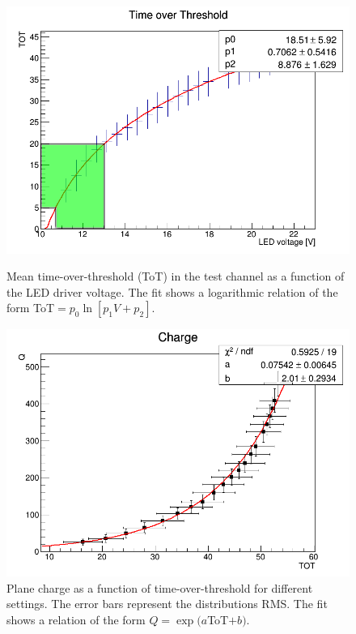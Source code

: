 \documentclass[a4paper,11pt]{article}
\begin{document}
\begin{figure}[htr!]
  \begin{minipage}[b]{.48\textwidth}
   \centering
   \includegraphics[width=\textwidth]{settings.png}
   \caption{Mean time-over-threshold (ToT) in the test channel as a function of the LED driver voltage. The fit shows a logarithmic relation of the form ToT$=p_0\ln\left[p_1V+p_2\right]$.}
   \label{fig:voltage}
  \end{minipage}
  \hfill
  \begin{minipage}[b]{.48\textwidth}
   \centering
   \includegraphics[width=\textwidth]{qvstot.png}
   \caption{Plane charge as a function of time-over-threshold for different settings. The error bars represent the distributions RMS. The fit shows a relation of the form $Q=\exp(a$ToT$+b)$.}
   \label{fig:charge_tot}
   \end{minipage}
\end{figure}
\end{document}
